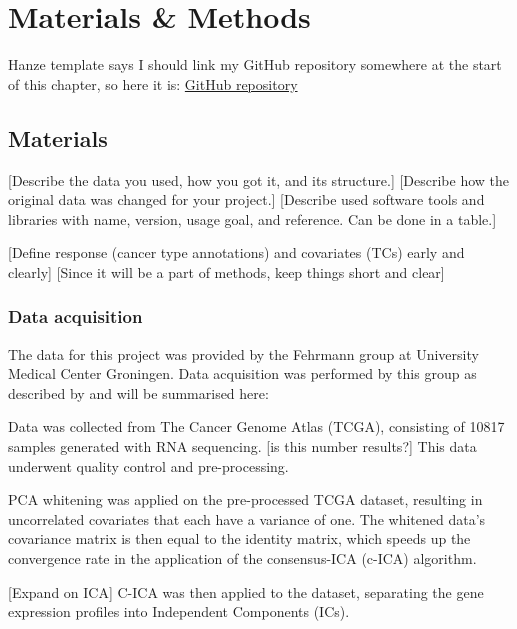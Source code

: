 \chapter{Materials \& Methods}
Hanze template says I should link my GitHub repository somewhere at the start of this chapter, so here it is:
\href{https://github.com/denniswiersma/internship}{GitHub repository}





\section{Materials}

[Describe the data you used, how you got it, and its structure.]
[Describe how the original data was changed for your project.]
[Describe used software tools and libraries with name, version, usage goal, and reference. Can be done in a table.]

[Define response (cancer type annotations) and covariates (TCs) early and clearly]
[Since it will be a part of methods, keep things short and clear]

\subsection{Data acquisition}
The data for this project was provided by the Fehrmann group at University Medical Center Groningen.
Data acquisition was performed by this group as described by \cite{bhat:cna} and will be summarised here:

Data was collected from The Cancer Genome Atlas (TCGA), consisting of 10817 samples generated with RNA sequencing. [is this number results?]
This data underwent quality control and pre-processing.

PCA whitening was applied on the pre-processed TCGA dataset, resulting in uncorrelated covariates that each have a variance of one.
The whitened data's covariance matrix is then equal to the identity matrix, which speeds up the convergence rate in the application of the consensus-ICA (c-ICA) algorithm.

[Expand on ICA]
C-ICA was then applied to the dataset, separating the gene expression profiles into Independent Components (ICs).

